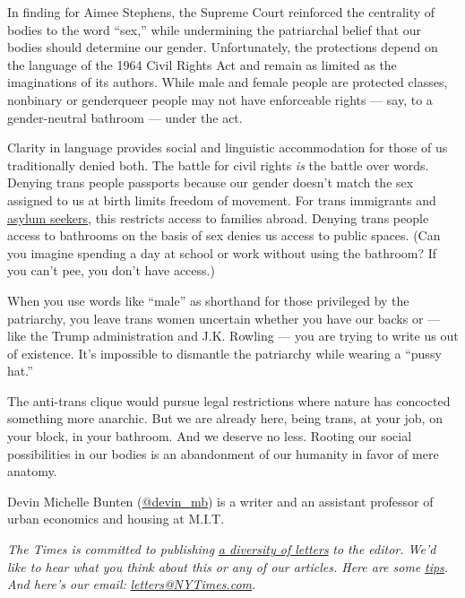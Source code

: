In finding for Aimee Stephens, the Supreme Court reinforced the
centrality of bodies to the word ``sex,'' while undermining the
patriarchal belief that our bodies should determine our gender.
Unfortunately, the protections depend on the language of the 1964 Civil
Rights Act and remain as limited as the imaginations of its authors.
While male and female people are protected classes, nonbinary or
genderqueer people may not have enforceable rights --- say, to a
gender-neutral bathroom --- under the act.

Clarity in language provides social and linguistic accommodation for
those of us traditionally denied both. The battle for civil rights
\emph{is} the battle over words. Denying trans people passports because
our gender doesn't match the sex assigned to us at birth limits freedom
of movement. For trans immigrants and
\href{https://www.hrc.org/blog/the-precarious-position-of-transgender-immigrants-and-asylum-seekers}{asylum
seekers}, this restricts access to families abroad. Denying trans people
access to bathrooms on the basis of sex denies us access to public
spaces. (Can you imagine spending a day at school or work without using
the bathroom? If you can't pee, you don't have access.)

When you use words like ``male'' as shorthand for those privileged by
the patriarchy, you leave trans women uncertain whether you have our
backs or --- like the Trump administration and J.K. Rowling --- you are
trying to write us out of existence. It's impossible to dismantle the
patriarchy while wearing a ``pussy hat.''

The anti-trans clique would pursue legal restrictions where nature has
concocted something more anarchic. But we are already here, being trans,
at your job, on your block, in your bathroom. And we deserve no less.
Rooting our social possibilities in our bodies is an abandonment of our
humanity in favor of mere anatomy.

Devin Michelle Bunten (\href{https://twitter.com/devin_mb}{@devin\_mb})
is a writer and an assistant professor of urban economics and housing at
M.I.T.

\emph{The Times is committed to publishing}
\href{https://www.nytimes3xbfgragh.onion/2019/01/31/opinion/letters/letters-to-editor-new-york-times-women.html}{\emph{a
diversity of letters}} \emph{to the editor. We'd like to hear what you
think about this or any of our articles. Here are some}
\href{https://help.nytimes3xbfgragh.onion/hc/en-us/articles/115014925288-How-to-submit-a-letter-to-the-editor}{\emph{tips}}\emph{.
And here's our email:}
\href{mailto:letters@NYTimes.com}{\emph{letters@NYTimes.com}}\emph{.}

